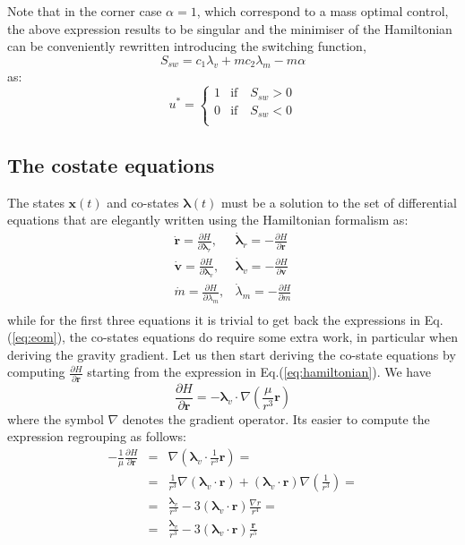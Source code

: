 \documentclass[graybox]{svmult}
\begin{document}
Note that in the corner case $\alpha = 1$, which correspond to a mass optimal control, the above expression results to be singular and the minimiser of the Hamiltonian can be conveniently rewritten introducing the switching function,
$$
S_{sw} =  c_1\lambda_v + m c_2 \lambda_m - m \alpha
$$
as:
\begin{equation}\label{eq:massoptimalu}
u^* = \left\{\begin{array}{ll}
1 & \mbox{if} \quad S_{sw} > 0 \\
0 & \mbox{if} \quad S_{sw} < 0 \\
\end{array}\right.
\end{equation}

\subsection {The costate equations}
The states $\mathbf x(t)$ and co-states $\boldsymbol \lambda(t)$ must be a solution to the set of differential equations that are elegantly written using the Hamiltonian formalism as:
$$
\begin{array}{ll}
\dot{\mathbf r} = \frac{\partial H}{\partial \boldsymbol \lambda_r}, & \dot{\boldsymbol \lambda}_r = - \frac{\partial H}{\partial \mathbf r} \\
\dot{\mathbf v} = \frac{\partial H}{\partial \boldsymbol \lambda_v}, & \dot{\boldsymbol \lambda}_v = - \frac{\partial H}{\partial \mathbf v}  \\
\dot{m} = \frac{\partial H}{\partial \lambda_m}, & \dot{\lambda}_m = - \frac{\partial H}{\partial m}  \\
\end{array}
$$
while for the first three equations it is trivial to get back the expressions in Eq.(\ref{eq:eom}), the co-states equations do require some extra work, in particular when deriving the gravity gradient. 
Let us then start deriving the co-state equations by computing $\frac{\partial H}{\partial \mathbf r}$ starting from the expression in Eq.(\ref{eq:hamiltonian}). We have
$$
\frac{\partial H}{\partial \mathbf r} = - \boldsymbol \lambda_v \cdot \nabla \left(\frac{\mu}{r^3}\mathbf r\right)
$$
where the symbol $\nabla$ denotes the gradient operator. Its easier to compute the expression regrouping as follows:
\begin{eqnarray*}
-\frac 1\mu\frac{\partial H}{\partial \mathbf r}& = & \nabla \left( \boldsymbol \lambda_v \cdot \frac{1}{r^3}\mathbf r\right) = \\
& = & \frac{1}{r^3} \nabla\left( \boldsymbol \lambda_v \cdot \mathbf r \right) + \left(\boldsymbol \lambda_v  \cdot \mathbf r\right) \nabla \left(\frac 1{r^3}\right) = \\
& = & \frac{\boldsymbol \lambda_v}{r^3} - 3 \left(\boldsymbol \lambda_v  \cdot \mathbf r\right) \frac{ \nabla r }{r^4}= \\
& = & \frac{\boldsymbol \lambda_v}{r^3} - 3 \left(\boldsymbol \lambda_v  \cdot \mathbf r\right) \frac{\mathbf r}{r^5}
\end{eqnarray*}
\end{document}
